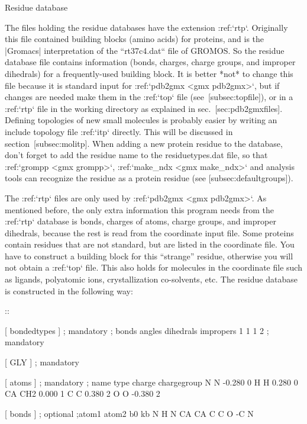 Residue database
~~~~~~~~~~~~~~~~

The files holding the residue databases have the extension :ref:`rtp`.
Originally this file contained building blocks (amino acids) for
proteins, and is the |Gromacs| interpretation of the ``rt37c4.dat`` file of
GROMOS. So the residue database file contains information (bonds,
charges, charge groups, and improper dihedrals) for a frequently-used
building block. It is better *not* to change this file because it is
standard input for :ref:`pdb2gmx <gmx pdb2gmx>`, but if changes are needed make them in the
:ref:`top` file (see [subsec:topfile]), or in a :ref:`rtp` file in the working
directory as explained in sec. [sec:pdb2gmxfiles]. Defining topologies
of new small molecules is probably easier by writing an include topology
file :ref:`itp` directly. This will be discussed in section [subsec:molitp].
When adding a new protein residue to the database, don’t forget to add
the residue name to the residuetypes.dat file, so that :ref:`grompp <gmx grompp>`, :ref:`make_ndx <gmx make_ndx>`
and analysis tools can recognize the residue as a protein residue (see
[subsec:defaultgroups]).

The :ref:`rtp` files are only used by :ref:`pdb2gmx <gmx pdb2gmx>`. As mentioned before, the only
extra information this program needs from the :ref:`rtp` database is bonds,
charges of atoms, charge groups, and improper dihedrals, because the
rest is read from the coordinate input file. Some proteins contain
residues that are not standard, but are listed in the coordinate file.
You have to construct a building block for this “strange” residue,
otherwise you will not obtain a :ref:`top` file. This also holds for molecules
in the coordinate file such as ligands, polyatomic ions, crystallization
co-solvents, etc. The residue database is constructed in the following
way:

::

    [ bondedtypes ]  ; mandatory
    ; bonds  angles  dihedrals  impropers
         1       1          1          2  ; mandatory

    [ GLY ]  ; mandatory

     [ atoms ]  ; mandatory 
    ; name  type  charge  chargegroup 
         N     N  -0.280     0
         H     H   0.280     0
        CA   CH2   0.000     1
         C     C   0.380     2
         O     O  -0.380     2

     [ bonds ]  ; optional
    ;atom1 atom2      b0      kb
         N     H
         N    CA
        CA     C
         C     O
        -C     N

